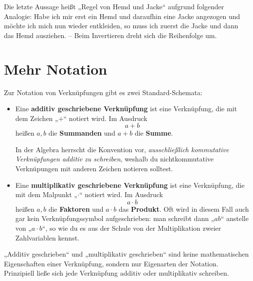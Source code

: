 \begin{bem} 
    Die letzte Aussage heißt „Regel von Hemd und Jacke“ aufgrund folgender Analogie: Habe ich mir erst ein Hemd und daraufhin eine Jacke angezogen und möchte ich mich nun wieder entkleiden, so muss ich zuerst die Jacke und dann das Hemd ausziehen. -- Beim Invertieren dreht sich die Reihenfolge um.
\end{bem}





\section{Mehr Notation}


\begin{nota}  
    Zur Notation von Verknüpfungen gibt es zwei Standard-Schemata:
    \begin{itemize}
        \item Eine \textbf{additiv geschriebene Verknüpfung} ist eine Verknüpfung, die mit dem Zeichen „$+$“ notiert wird. Im Ausdruck
            \[ a + b\]
        heißen $a,b$ die \textbf{Summanden} und $a+b$ die \textbf{Summe}.
        
        In der Algebra herrscht die Konvention vor, \emph{ausschließlich kommutative Verknüpfungen additiv zu schreiben}, weshalb du nichtkommutative Verknüpungen mit anderen Zeichen notieren solltest.
        \item Eine \textbf{multiplikativ geschriebene Verknüpfung} ist eine Verknüpfung, die mit dem Malpunkt „$\cdot$“ notiert wird. Im Ausdruck
            \[ a\cdot b \]
        heißen $a,b$ die \textbf{Faktoren} und $a\cdot b$ das \textbf{Produkt}. Oft wird in diesem Fall auch gar kein Verknüpfungssymbol aufgeschrieben: man schreibt dann „$ab$“ anstelle von „$a\cdot b$“, so wie du es aus der Schule von der Multiplikation zweier Zahlvariablen kennst.
    \end{itemize}
    „Additiv geschrieben“ und „multiplikativ geschrieben“ sind keine mathematischen Eigenschaften einer Verknüpfung, sondern nur Eigenarten der Notation. Prinzipiell ließe sich jede Verknüpfung additiv oder multiplikativ schreiben.
\end{nota}


